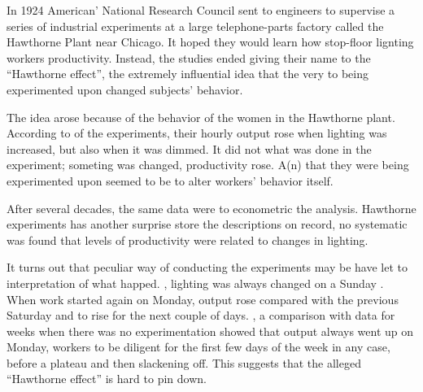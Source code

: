 \qquad In 1924 American' National Research Council sent to engineers to supervise a series of industrial experiments at a large telephone-parts factory called the Hawthorne Plant near Chicago. It hoped they would learn how stop-floor lignting \underline{\quad} workers productivity. Instead, the studies ended \underline{\quad} giving their name to the ``Hawthorne effect'', the extremely influential idea that the very \underline{\quad} to being experimented upon changed subjects' behavior.

\qquad The idea arose because of the \underline{\quad} behavior of the women in the Hawthorne plant. According to \underline{\quad} of the experiments, their hourly output rose when lighting was increased, but also when it was dimmed. It did not \underline{\quad} what was done in the experiment; \underline{\quad} someting was changed, productivity rose. A(n) \underline{\quad} that they were being experimented upon seemed to be \underline{\quad} to alter workers' behavior \underline{\quad} itself.

\qquad After several decades, the same data were \underline{\quad} to econometric the analysis. Hawthorne experiments has another surprise store \underline{\quad} the descriptions on record, no systematic \underline{\quad} was found that levels of productivity were related to changes in lighting.

\qquad It turns out that peculiar way of conducting the experiments may be have let to \underline{\quad} interpretation of what happed. \underline{\quad}, lighting was always changed on a Sunday . When work started again on Monday, output \underline{\quad} rose compared with the previous Saturday and \underline{\quad} to rise for the next couple of days. \underline{\quad}, a comparison with data for weeks when there was no experimentation showed that output always went up on Monday, workers \underline{\quad} to be diligent for the first few days of the week in any case, before \underline{\quad} a plateau and then slackening off. This suggests that the alleged ``Hawthorne effect'' is hard to pin down.

